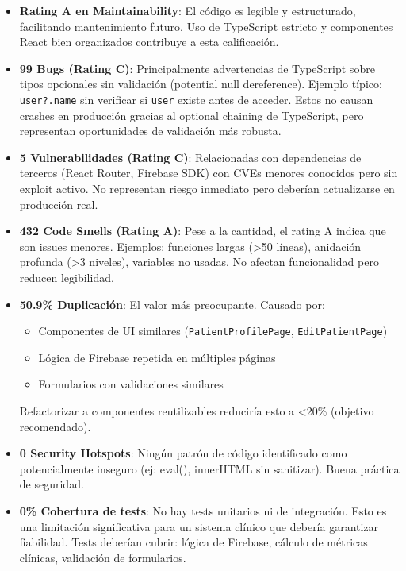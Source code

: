\begin{itemize}
    \item \textbf{Rating A en Maintainability}: El código es legible y estructurado, facilitando mantenimiento futuro. Uso de TypeScript estricto y componentes React bien organizados contribuye a esta calificación.
    
    \item \textbf{99 Bugs (Rating C)}: Principalmente advertencias de TypeScript sobre tipos opcionales sin validación (potential null dereference). Ejemplo típico: \texttt{user?.name} sin verificar si \texttt{user} existe antes de acceder. Estos no causan crashes en producción gracias al optional chaining de TypeScript, pero representan oportunidades de validación más robusta.
    
    \item \textbf{5 Vulnerabilidades (Rating C)}: Relacionadas con dependencias de terceros (React Router, Firebase SDK) con CVEs menores conocidos pero sin exploit activo. No representan riesgo inmediato pero deberían actualizarse en producción real.
    
    \item \textbf{432 Code Smells (Rating A)}: Pese a la cantidad, el rating A indica que son issues menores. Ejemplos: funciones largas (>50 líneas), anidación profunda (>3 niveles), variables no usadas. No afectan funcionalidad pero reducen legibilidad.
    
    \item \textbf{50.9\% Duplicación}: El valor más preocupante. Causado por:
    \begin{itemize}
        \item Componentes de UI similares (\texttt{PatientProfilePage}, \texttt{EditPatientPage})
        \item Lógica de Firebase repetida en múltiples páginas
        \item Formularios con validaciones similares
    \end{itemize}
    Refactorizar a componentes reutilizables reduciría esto a <20\% (objetivo recomendado).
    
    \item \textbf{0 Security Hotspots}: Ningún patrón de código identificado como potencialmente inseguro (ej: eval(), innerHTML sin sanitizar). Buena práctica de seguridad.
    
    \item \textbf{0\% Cobertura de tests}: No hay tests unitarios ni de integración. Esto es una limitación significativa para un sistema clínico que debería garantizar fiabilidad. Tests deberían cubrir: lógica de Firebase, cálculo de métricas clínicas, validación de formularios.
\end{itemize}

